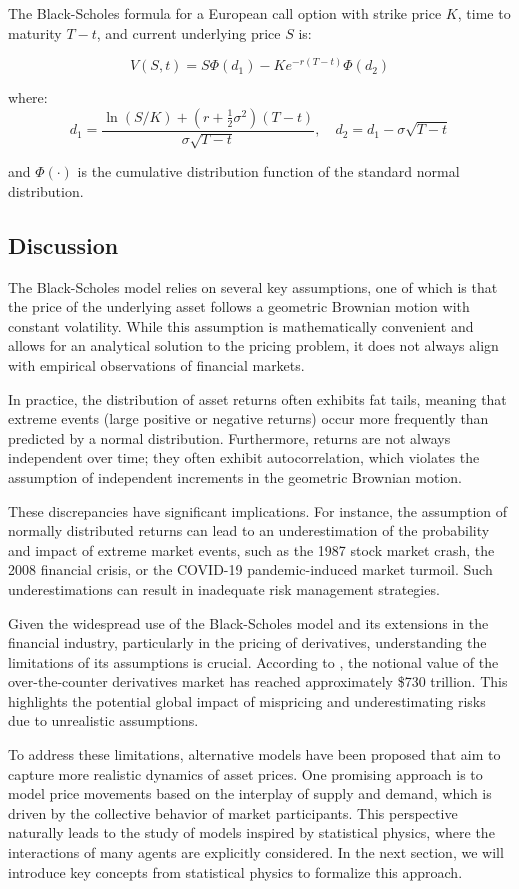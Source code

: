 The Black-Scholes formula for a European call option with strike price \( K \), time to maturity \( T - t \), and current underlying price \( S \) is:

\[
V(S,t) = S \Phi(d_1) - K e^{-r(T - t)} \Phi(d_2)
\]

where:
\[
d_1 = \frac{\ln(S/K) + (r + \frac{1}{2} \sigma^2)(T - t)}{\sigma \sqrt{T - t}}, \quad
d_2 = d_1 - \sigma \sqrt{T - t}
\]

and \( \Phi(\cdot) \) is the cumulative distribution function of the standard normal distribution.

\subsection{Discussion}
The Black-Scholes model relies on several key assumptions, one of which is that the price of the underlying asset follows a geometric Brownian motion with constant volatility. While this assumption is mathematically convenient and allows for an analytical solution to the pricing problem, it does not always align with empirical observations of financial markets.

In practice, the distribution of asset returns often exhibits fat tails, meaning that extreme events (large positive or negative returns) occur more frequently than predicted by a normal distribution. Furthermore, returns are not always independent over time; they often exhibit autocorrelation, which violates the assumption of independent increments in the geometric Brownian motion.

These discrepancies have significant implications. For instance, the assumption of normally distributed returns can lead to an underestimation of the probability and impact of extreme market events, such as the 1987 stock market crash, the 2008 financial crisis, or the COVID-19 pandemic-induced market turmoil. Such underestimations can result in inadequate risk management strategies.

Given the widespread use of the Black-Scholes model and its extensions in the financial industry, particularly in the pricing of derivatives, understanding the limitations of its assumptions is crucial. According to \cite{bis}, the notional value of the over-the-counter derivatives market has reached approximately \$730 trillion. This highlights the potential global impact of mispricing and underestimating risks due to unrealistic assumptions.

To address these limitations, alternative models have been proposed that aim to capture more realistic dynamics of asset prices. One promising approach is to model price movements based on the interplay of supply and demand, which is driven by the collective behavior of market participants. This perspective naturally leads to the study of models inspired by statistical physics, where the interactions of many agents are explicitly considered. In the next section, we will introduce key concepts from statistical physics to formalize this approach.


